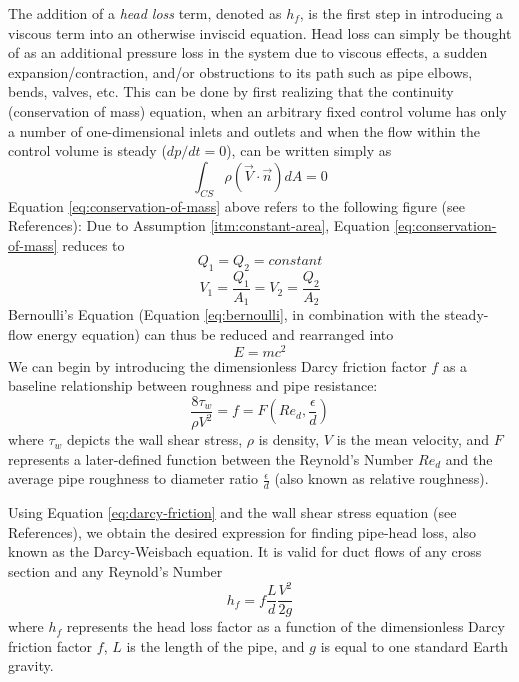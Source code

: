 \documentclass[11pt]{article} %
\numberwithin{equation}{section} %
\begin{document}
The addition of a \textit{head loss} term, denoted as $h_{f}$, is the first step in introducing a viscous term into an otherwise inviscid equation. Head loss can simply be thought of as an additional pressure loss in the system due to viscous effects, a sudden expansion/contraction, and/or obstructions to its path such as pipe elbows, bends, valves, etc. This can be done by first realizing that the continuity (conservation of mass) equation, when an arbitrary fixed control volume has only a number of one-dimensional inlets and outlets and when the flow within the control volume is steady ($dp/dt = 0$), can be written simply as
\begin{equation} \label{eq:conservation-of-mass}
\int_{CS} \rho(\vec{V} \cdot \vec{n}) dA = 0
\end{equation}
Equation \ref{eq:conservation-of-mass} above refers to the following figure (see References):
Due to Assumption \ref{itm:constant-area}, Equation \ref{eq:conservation-of-mass} reduces to 
\begin{equation}
Q_{1} = Q_{2} = constant
\end{equation}
\begin{equation}
V_{1} = \frac{Q_{1}}{A_{1}} = V_{2} = \frac{Q_{2}}{A_{2}}
\end{equation}
Bernoulli's Equation (Equation \ref{eq:bernoulli}, in combination with the steady-flow energy equation) can thus be reduced and rearranged into
\begin{equation}
E =mc^{2}
\end{equation}
We can begin by introducing the dimensionless Darcy friction factor $f$ as a baseline relationship between roughness and pipe resistance:
\begin{equation} \label{eq:darcy-friction}
\frac{8 \tau_{w}}{\rho V^{2}} = f = F(Re_{d}, \frac{\epsilon}{d})
\end{equation}
where $\tau_{w}$ depicts the wall shear stress, $\rho$ is density, $V$ is the mean velocity, and $F$ represents a later-defined function between the Reynold's Number $Re_{d}$ and the average pipe roughness to diameter ratio $\frac{\epsilon}{d}$ (also known as relative roughness).

Using Equation \ref{eq:darcy-friction} and the wall shear stress equation (see References), we obtain the desired expression for finding pipe-head loss, also known as the Darcy-Weisbach equation. It is valid for duct flows of any cross section and any Reynold's Number
\begin{equation} \label{eq:darcy-weisbach}
h_{f} = f{\frac{L}{d}}{\frac{V^{2}}{2{g}}}
\end{equation}
where $h_{f}$ represents the head loss factor as a function of the dimensionless Darcy friction factor $f$, $L$ is the length of the pipe, and $g$ is equal to one standard Earth gravity.
\end{document}
